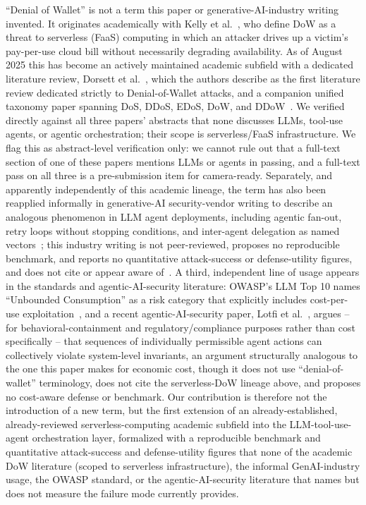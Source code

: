 \documentclass[conference]{IEEEtran}
\begin{document}
``Denial of Wallet'' is not a term this paper or generative-AI-industry writing invented. It originates academically with Kelly et al.~\cite{kelly2021dow}, who define DoW as a threat to serverless (FaaS) computing in which an attacker drives up a victim's pay-per-use cloud bill without necessarily degrading availability. As of August 2025 this has become an actively maintained academic subfield with a dedicated literature review, Dorsett et al.~\cite{dorsett2025dowreview}, which the authors describe as the first literature review dedicated strictly to Denial-of-Wallet attacks, and a companion unified taxonomy paper spanning DoS, DDoS, EDoS, DoW, and DDoW~\cite{dorsett2025dowtaxonomy}. We verified directly against all three papers' abstracts that none discusses LLMs, tool-use agents, or agentic orchestration; their scope is serverless/FaaS infrastructure. We flag this as abstract-level verification only: we cannot rule out that a full-text section of one of these papers mentions LLMs or agents in passing, and a full-text pass on all three is a pre-submission item for camera-ready. Separately, and apparently independently of this academic lineage, the term has also been reapplied informally in generative-AI security-vendor writing to describe an analogous phenomenon in LLM agent deployments, including agentic fan-out, retry loops without stopping conditions, and inter-agent delegation as named vectors~\cite{promptsecurity2025dow}; this industry writing is not peer-reviewed, proposes no reproducible benchmark, and reports no quantitative attack-success or defense-utility figures, and does not cite or appear aware of~\cite{kelly2021dow,dorsett2025dowreview,dorsett2025dowtaxonomy}. A third, independent line of usage appears in the standards and agentic-AI-security literature: OWASP's LLM Top 10 names ``Unbounded Consumption'' as a risk category that explicitly includes cost-per-use exploitation~\cite{owasp2025llm10}, and a recent agentic-AI-security paper, Lotfi et al.~\cite{lotfi2026trajectory}, argues -- for behavioral-containment and regulatory/compliance purposes rather than cost specifically -- that sequences of individually permissible agent actions can collectively violate system-level invariants, an argument structurally analogous to the one this paper makes for economic cost, though it does not use ``denial-of-wallet'' terminology, does not cite the serverless-DoW lineage above, and proposes no cost-aware defense or benchmark. Our contribution is therefore not the introduction of a new term, but the first extension of an already-established, already-reviewed serverless-computing academic subfield into the LLM-tool-use-agent orchestration layer, formalized with a reproducible benchmark and quantitative attack-success and defense-utility figures that none of the academic DoW literature (scoped to serverless infrastructure), the informal GenAI-industry usage, the OWASP standard, or the agentic-AI-security literature that names but does not measure the failure mode currently provides.
\end{document}
